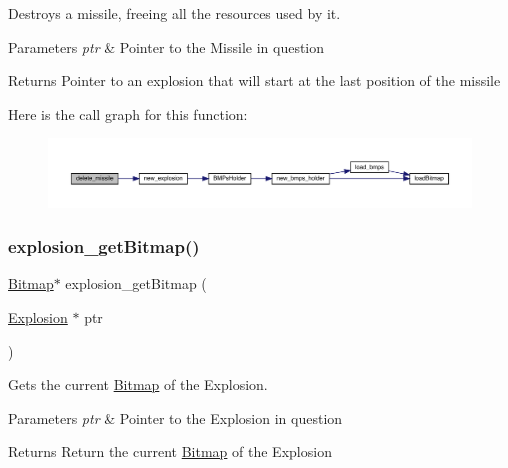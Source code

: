 Destroys a missile, freeing all the resources used by it. 


\begin{DoxyParams}{Parameters}
{\em ptr} & Pointer to the Missile in question\\
\hline
\end{DoxyParams}
\begin{DoxyReturn}{Returns}
Pointer to an explosion that will start at the last position of the missile 
\end{DoxyReturn}
Here is the call graph for this function\+:\nopagebreak
\begin{figure}[H]
\begin{center}
\leavevmode
\includegraphics[width=350pt]{group___missile_ga693cd51b6557695cb6593b56fbc89df8_cgraph}
\end{center}
\end{figure}
\hypertarget{group___missile_ga1f8e365295b2facc195f17155bba6b71}{}\label{group___missile_ga1f8e365295b2facc195f17155bba6b71} 
\subsubsection{\texorpdfstring{explosion\+\_\+get\+Bitmap()}{explosion\_getBitmap()}}
{\footnotesize\ttfamily \hyperlink{struct_bitmap}{Bitmap}$\ast$ explosion\+\_\+get\+Bitmap (\begin{DoxyParamCaption}\item[{\hyperlink{group___missile_gab15157e0eccd9297f66644015d4966b1}{Explosion} $\ast$}]{ptr }\end{DoxyParamCaption})}



Gets the current \hyperlink{struct_bitmap}{Bitmap} of the Explosion. 


\begin{DoxyParams}{Parameters}
{\em ptr} & Pointer to the Explosion in question\\
\hline
\end{DoxyParams}
\begin{DoxyReturn}{Returns}
Return the current \hyperlink{struct_bitmap}{Bitmap} of the Explosion 
\end{DoxyReturn}
\hypertarget{group___missile_gaaa4dd8460fa2eeb803f0e62b0b693589}{}\label{group___missile_gaaa4dd8460fa2eeb803f0e62b0b693589} 
